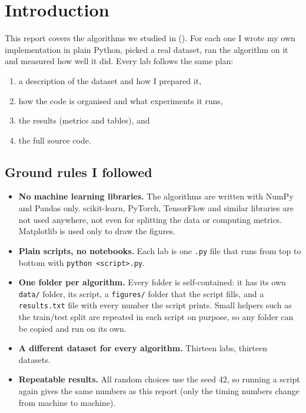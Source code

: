 \chapter*{Introduction}

This report covers the algorithms we studied in \CourseCode{} (\CourseTitle). For each one I wrote my
own implementation in plain Python, picked a real dataset, ran the algorithm on it and measured how well
it did. Every lab follows the same plan:

\begin{enumerate}[label=\arabic*.]
  \item a description of the dataset and how I prepared it,
  \item how the code is organised and what experiments it runs,
  \item the results (metrics and tables), and
  \item the full source code.
\end{enumerate}

\section*{Ground rules I followed}
\begin{itemize}
  \item \textbf{No machine learning libraries.} The algorithms are written with NumPy and Pandas only.
        scikit-learn, PyTorch, TensorFlow and similar libraries are not used anywhere, not even for
        splitting the data or computing metrics. Matplotlib is used only to draw the figures.
  \item \textbf{Plain scripts, no notebooks.} Each lab is one \texttt{.py} file that runs from top to
        bottom with \texttt{python <script>.py}.
  \item \textbf{One folder per algorithm.} Every folder is self-contained: it has its own
        \texttt{data/} folder, its script, a \texttt{figures/} folder that the script fills, and a
        \texttt{results.txt} file with every number the script prints. Small helpers such as the
        train/test split are repeated in each script on purpose, so any folder can be copied and run
        on its own.
  \item \textbf{A different dataset for every algorithm.} Thirteen labs, thirteen datasets.
  \item \textbf{Repeatable results.} All random choices use the seed 42, so running a script again
        gives the same numbers as this report (only the timing numbers change from machine to machine).
\end{itemize}

